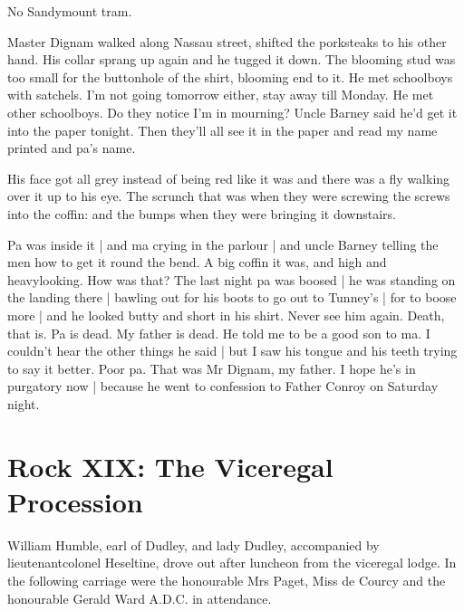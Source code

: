 No Sandymount tram.

Master Dignam walked along Nassau street,
shifted the porksteaks to his other hand.
His collar sprang up again and he tugged it down.
The blooming stud was too small for the buttonhole of the shirt,
blooming end to it.
He met schoolboys with satchels.
I'm not going tomorrow either,
stay away till Monday.
He met other schoolboys.
Do they notice I'm in mourning?
Uncle Barney said he'd get it into the paper tonight.
Then they'll all see it in the paper
and read my name printed and pa's name.

His face got all grey
instead of being red like it was
and there was a
fly walking over it
up to his eye.
The scrunch that was
when they were
screwing the screws into the coffin:
and the bumps when they were bringing
it downstairs.

Pa was inside it |
and ma crying in the parlour |
and uncle Barney telling the men
how to get it round the bend.
A big coffin it was,
and high and heavylooking.
How was that?
The last night pa was boosed |
he was standing on the landing there |
bawling out for his boots to go out to Tunney's |
for to boose more |
and he looked butty and short in his shirt.
Never see him again.
Death, that is.
Pa is dead.
My father is dead.
He told me to be a good son to ma.
I couldn't hear the other things he said |
but I saw his tongue and his teeth trying to say it better.
Poor pa.
That was Mr Dignam, my father.
I hope he's in purgatory now |
because he went to confession to Father Conroy on Saturday night.


\section*{Rock XIX: The Viceregal Procession}


William Humble,
earl of Dudley,
and lady Dudley,
accompanied by
lieutenantcolonel Heseltine,
drove out after luncheon
from the viceregal
lodge.
In the following carriage
were the honourable Mrs Paget,
Miss de
Courcy
and the honourable Gerald Ward A.D.C.
in attendance.

